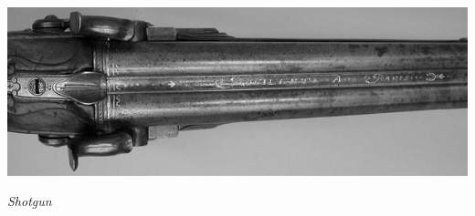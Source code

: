 \begin{multicols}{2}

\end{multicols}

\vfill

\begin{center}
\includegraphics[width=0.8\linewidth]{immagini/Double-barreled_Shotgun.png}

\emph{Shotgun}
\end{center}

\pagebreak
